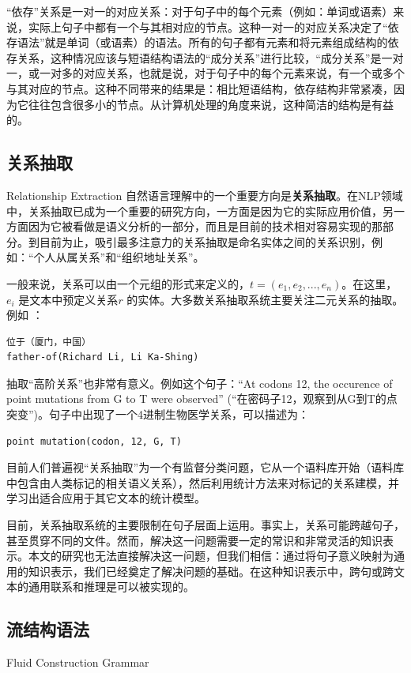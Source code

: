 “依存”关系是一对一的对应关系：对于句子中的每个元素（例如：单词或语素）来说，实际上句子中都有一个与其相对应的节点。这种一对一的对应关系决定了“依存语法”就是单词（或语素）的语法。所有的句子都有元素和将元素组成结构的依存关系，这种情况应该与短语结构语法的“成分关系”进行比较，“成分关系”是一对一，或一对多的对应关系，也就是说，对于句子中的每个元素来说，有一个或多个与其对应的节点。这种不同带来的结果是：相比短语结构，依存结构非常紧凑，因为它往往包含很多小的节点。从计算机处理的角度来说，这种简洁的结构是有益的。


\subsection{关系抽取}{Relationship Extraction}
自然语言理解中的一个重要方向是{\bf 关系抽取}。在NLP领域中，关系抽取已成为一个重要的研究方向，一方面是因为它的实际应用价值，另一方面因为它被看做是语义分析的一部分，而且是目前的技术相对容易实现的那部分。到目前为止，吸引最多注意力的关系抽取是命名实体之间的关系识别，例如：“个人从属关系”和“组织地址关系”。

一般来说，关系可以由一个元组的形式来定义的，$t = (e_1, e_2, ...,e_n)$。在这里，$e_i$ 是文本中预定义关系$r$ 的实体。大多数关系抽取系统主要关注二元关系的抽取。例如 ：

\begin{verbatim}
位于（厦门，中国）
father-of(Richard Li, Li Ka-Shing)
\end{verbatim}

抽取“高阶关系”也非常有意义。例如这个句子：``At codons 12, the occurence of point mutations from G to T were observed'' (“在密码子12，观察到从G到T的点突变”)。句子中出现了一个4进制生物医学关系，可以描述为：

\begin{verbatim}
point mutation(codon, 12, G, T)
\end{verbatim}

目前人们普遍视“关系抽取”为一个有监督分类问题，它从一个语料库开始（语料库中包含由人类标记的相关语义关系），然后利用统计方法来对标记的关系建模，并学习出适合应用于其它文本的统计模型。

目前，关系抽取系统的主要限制在句子层面上运用。事实上，关系可能跨越句子，甚至贯穿不同的文件。然而，解决这一问题需要一定的常识和非常灵活的知识表示。本文的研究也无法直接解决这一问题，但我们相信：通过将句子意义映射为通用的知识表示，我们已经奠定了解决问题的基础。在这种知识表示中，跨句或跨文本的通用联系和推理是可以被实现的。

\subsection{流结构语法}{Fluid Construction Grammar}

